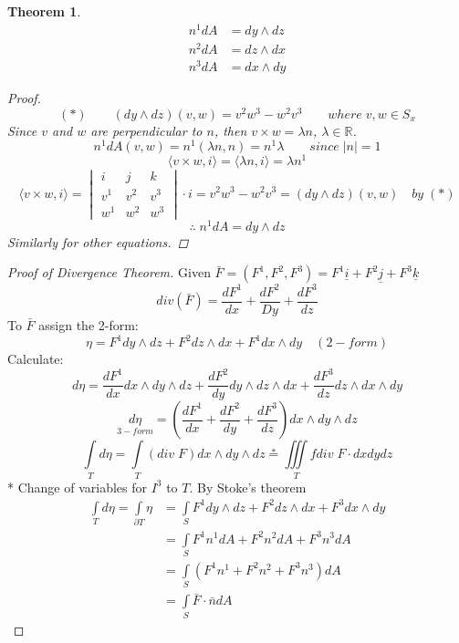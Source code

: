 \documentclass[11pt]{article}
\def\RR{\mathbb{R}}
\newtheorem{theorem}{Theorem}[section]
\begin{document}
\begin{theorem}
\begin{align*}
n^1dA &= dy\wedge dz\\
n^2dA &= dz\wedge dx\\
n^3dA &= dx\wedge dy
\end{align*}
\begin{proof}
\[(*)\qquad (dy \wedge dz)(v,w)= v^2w^3 - w^2v^3\qquad where\; v,w \in S_x\]
Since $v$ and $w$ are perpendicular to $n$, then $v \times w = \lambda n$, $\lambda \in \RR$. 
\[n^1dA(v,w) = n^1 (\lambda n,n) = n^1 \lambda \qquad since\;|n|=1\]
\[\langle v \times w, i \rangle = \langle \lambda n, i \rangle = \lambda n^1\]
\[\langle v \times w, i \rangle = \begin{vmatrix} i &j &k \\ v^1 &v^2 &v^3 \\ w^1 &w^2 &w^3 \end{vmatrix} \cdot i =  v^2w^3 - w^2v^3 = (dy \wedge dz)(v,w) \quad by \;(*)\]
\[\therefore \;n^1dA = dy\wedge dz\]
Similarly for other equations.
\end{proof}
\end{theorem}

\begin{proof}[Proof of Divergence Theorem]
Given $\bar{F} = (F^1, F^2, F^3) = F^1\underline{i}+ F^2\underline{j} + F^3\underline{k}$
\[div(\bar{F}) = \frac{dF^1}{dx} + \frac{dF^2}{Dy} + \frac{dF^3}{dz}\]
To $\bar{F}$ assign the 2-form:
\[\eta = F^1 dy \wedge dz + F^2 dz \wedge dx + F^1 dx \wedge dy \quad (2-form)\]
Calculate:
\[d\eta = \frac{dF^1}{dx} dx \wedge dy \wedge dz + \frac{dF^2}{dy} dy \wedge dz \wedge dx + \frac{dF^3}{dz} dz \wedge dx \wedge dy\]
\[\underset{3-form}{d\eta} =\left( \frac{dF^1}{dx} + \frac{dF^2}{dy} + \frac{dF^3}{dz} \right) dx \wedge dy \wedge dz \]
\[\int\limits_{T}d\eta =\int\limits_{T}\left(div \; F \right) dx \wedge dy \wedge dz \overset{*}{=} \iiint\limits_{T}f div\;F \cdot dxdydz \] * Change of variables for $I^3$ to $T$. By Stoke's theorem
\begin{align*}
\int\limits_{T}d\eta =\int\limits_{\partial T}\eta &= \int\limits_{S}F^1dy\wedge dz+ F^2dz\wedge dx + F^3dx\wedge dy\\
&= \int\limits_{S}F^1n^1dA+ F^2 n^2 dA+ F^3 n^3 dA\\
&= \int\limits_{S} (F^1n^1+ F^2 n^2 + F^3 n^3) dA\\
&= \int\limits_{S} \bar{F}\cdot \bar{n} dA 
\end{align*}
\end{proof}
\end{document}
